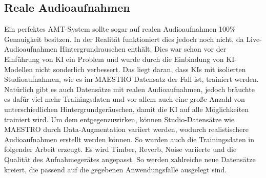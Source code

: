 \subsection{Reale Audioaufnahmen}
Ein perfektes AMT-System sollte sogar auf realen Audioaufnahmen 100\% Genauigkeit besitzen.
In der Realität funktioniert dies jedoch noch nicht, da Live-Audioaufnahmen Hintergrundrauschen enthält.
Dies war schon vor der Einführung von KI ein Problem und wurde durch die Einbindung
von KI-Modellen nicht sonderlich verbessert.
Das liegt daran, dass KIs mit isolierten Studioaufnahmen, wie es im MAESTRO Datensatz der Fall ist, trainiert werden.
Natürlich gibt es auch Datensätze mit realen Audioaufnahmen, jedoch bräuchte es dafür viel mehr Trainingsdaten und
vor allem auch eine große Anzahl von unterschiedlichen Hintergrundgeräuschen,
damit die KI auf alle Möglichkeiten trainiert wird.
Um dem entgegenzuwirken, können Studio-Datensätze wie MAESTRO durch Data-Augmentation variiert werden,
wodurch realistischere Audioaufnahmen erstellt werden können.
So wurden auch die Trainingsdaten in folgender Arbeit erzeugt.
\cite{kusaka2024mobile}
Es wird Timber, Reverb, Noise variierte und die Qualität des Aufnahmegerätes angepasst.
So werden zahlreiche neue Datensätze kreiert, die passend auf die gegebenen Anwendungsfälle ausgelegt sind.

